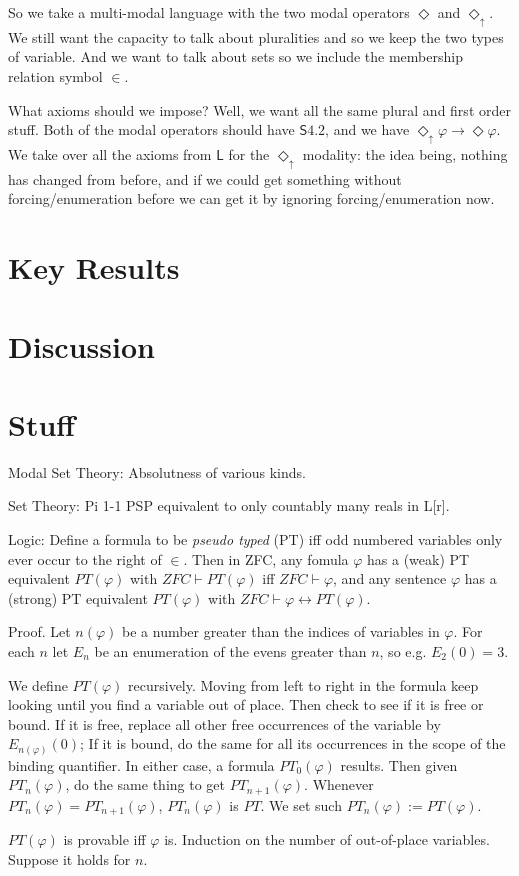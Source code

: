\documentclass{article}
\newcommand{\du}{\Diamond_\uparrow}
\begin{document}
So we take a multi-modal language with the two modal operators $\Diamond$ and $\du$. We still 
want the capacity to talk about pluralities and so we keep the two types of variable. 
And we want to talk about sets so we include the membership relation symbol $\in$. 

What axioms should we impose? Well, we want all the same plural and first order stuff.
Both of the modal operators should have $\mathsf{S4.2}$, and
we have $\du \varphi \rightarrow \Diamond \varphi$. We take over 
all the axioms from $\mathsf{L}$ for the $\du$ modality: the idea being, nothing 
has changed from before, and if we could get something without forcing/enumeration before 
we can get it by ignoring forcing/enumeration now.
\section{Key Results}
\section{Discussion}
\section{Stuff}
Modal Set Theory:
Absolutness of various kinds.

Set Theory: 
Pi 1-1 PSP equivalent to only countably many reals in L[r].

Logic: 
Define a formula to be \emph{pseudo typed} (PT) iff 
odd numbered variables only ever occur
to the right of $\in$. 
Then in ZFC, any fomula $\varphi$ has a (weak) PT equivalent
$PT(\varphi)$ with $ZFC \vdash PT(\varphi)$ iff $ZFC \vdash \varphi$, 
and any sentence 
$\varphi$ has a (strong) PT equivalent $PT(\varphi)$ with 
$ZFC \vdash \varphi \leftrightarrow PT(\varphi)$.

Proof. Let $n(\varphi)$ be a number greater than the indices of variables in 
$\varphi$. For each $n$ let $E_n$ be an enumeration of 
the evens greater than $n$, so e.g. $E_2(0)=3$. 

We define $PT(\varphi)$ recursively. Moving from left to right in the formula 
keep looking until you find a variable out of place. Then check to see 
if it is free or bound. If it is free, replace all other free occurrences of the 
variable by $E_{n(\varphi)}(0)$; If 
it is bound, do the same for all its occurrences in the scope 
of the binding quantifier. In either case, a formula $PT_0(\varphi)$
results. Then given $PT_n(\varphi)$, do the same thing to get $PT_{n+1}(\varphi)$.
Whenever $PT_n(\varphi) = PT_{n+1}(\varphi)$, $PT_n(\varphi)$ is $PT$. We set 
such $PT_n(\varphi) := PT(\varphi)$.

$PT(\varphi)$ is provable iff $\varphi$ is. Induction on the number of out-of-place 
variables. Suppose it holds for $n$. 
\end{document}
